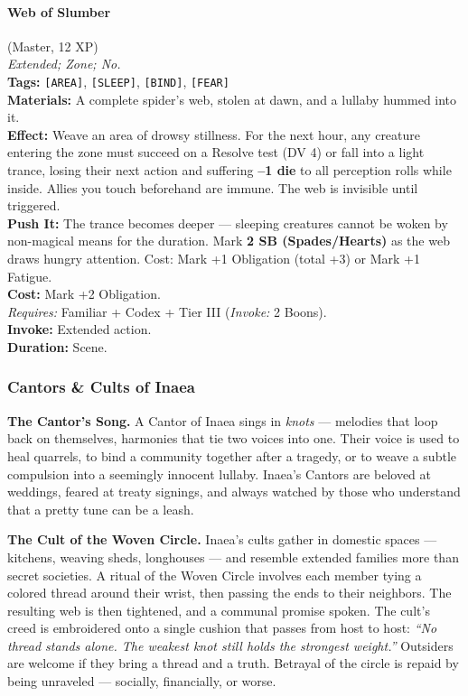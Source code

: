 \paragraph{Web of Slumber} (Master, 12 XP) \hfill \\
\emph{Extended; Zone; No.} \\
\textbf{Tags:} \texttt{[AREA]}, \texttt{[SLEEP]}, \texttt{[BIND]}, \texttt{[FEAR]} \\
\textbf{Materials:} A complete spider's web, stolen at dawn, and a lullaby hummed into it. \\
\textbf{Effect:} Weave an area of drowsy stillness. For the next hour, any creature entering the zone must succeed on a Resolve test (DV 4) or fall into a light trance, losing their next action and suffering \textbf{--1 die} to all perception rolls while inside. Allies you touch beforehand are immune. The web is invisible until triggered. \\
\textbf{Push It:} The trance becomes deeper --- sleeping creatures cannot be woken by non-magical means for the duration. Mark \textbf{2 SB (Spades/Hearts)} as the web draws hungry attention. Cost: Mark +1 Obligation (total +3) or Mark +1 Fatigue. \\
\textbf{Cost:} Mark +2 Obligation. \\
\textit{Requires:} Familiar + Codex + Tier III (\textit{Invoke:} 2 Boons). \\
\textbf{Invoke:} Extended action. \\
\textbf{Duration:} Scene.

\subsubsection*{Cantors \& Cults of Inaea}

\textbf{The Cantor's Song.} A Cantor of Inaea sings in \textit{knots} --- melodies that loop back on themselves, harmonies that tie two voices into one. Their voice is used to heal quarrels, to bind a community together after a tragedy, or to weave a subtle compulsion into a seemingly innocent lullaby. Inaea's Cantors are beloved at weddings, feared at treaty signings, and always watched by those who understand that a pretty tune can be a leash.

\textbf{The Cult of the Woven Circle.} Inaea's cults gather in domestic spaces --- kitchens, weaving sheds, longhouses --- and resemble extended families more than secret societies. A ritual of the Woven Circle involves each member tying a colored thread around their wrist, then passing the ends to their neighbors. The resulting web is then tightened, and a communal promise spoken. The cult's creed is embroidered onto a single cushion that passes from host to host: \textit{``No thread stands alone. The weakest knot still holds the strongest weight.''} Outsiders are welcome if they bring a thread and a truth. Betrayal of the circle is repaid by being unraveled --- socially, financially, or worse.

